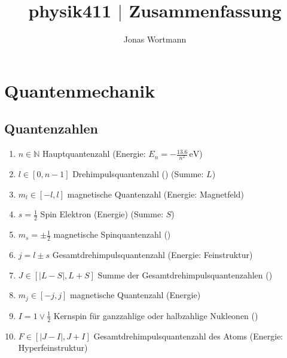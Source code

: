 \documentclass[a4paper,12pt]{article}
\numberwithin{equation}{section}
\begin{document}

\title{physik411 $|$ Zusammenfassung}
\author{Jonas Wortmann}
\maketitle
{}


\newpage


\fancyhead[L]{\thepage}
\fancyfoot[C]{}

\tableofcontents


\newpage


\fancyhead[R]{\leftmark\\\rightmark}

\newpage
\section{Quantenmechanik}
\subsection{Quantenzahlen}
\begin{enumerate}[label=--]
        \item $n  \in \mathbb{N}$ Hauptquantenzahl (Energie: $E_n=-\tfrac{13.6}{n^2}\,\text{eV}$)
        \item $l  \in \left[0,n-1\right]$ Drehimpulsquantenzahl () (Summe: $L$)
        \item $m_l  \in \left[-l,l\right]$ magnetische Quantenzahl (Energie: Magnetfeld)
        \item $s = \tfrac{1}{2}$ Spin Elektron (Energie) (Summe: $S$)
        \item $m_s = \pm \tfrac{1}{2}$ magnetische Spinquantenzahl ()
        \item $j = l \pm s$ Gesamtdrehimpulsquantenzahl (Energie: Feinstruktur)
        \item $J  \in \left[|L-S|,L+S\right]$ Summe der Gesamtdrehimpulsquantenzahlen ()
        \item $m_j  \in \left[-j,j\right]$ magnetische Quantenzahl (Energie)
        \item $I = 1\lor \tfrac{1}{2}$ Kernspin für ganzzahlige oder halbzahlige Nukleonen ()
        \item $F  \in \left[|J-I|,J+I\right]$ Gesamtdrehimpulsquantenzahl des Atoms (Energie: Hyperfeinstruktur)
\end{enumerate}
\end{document}
